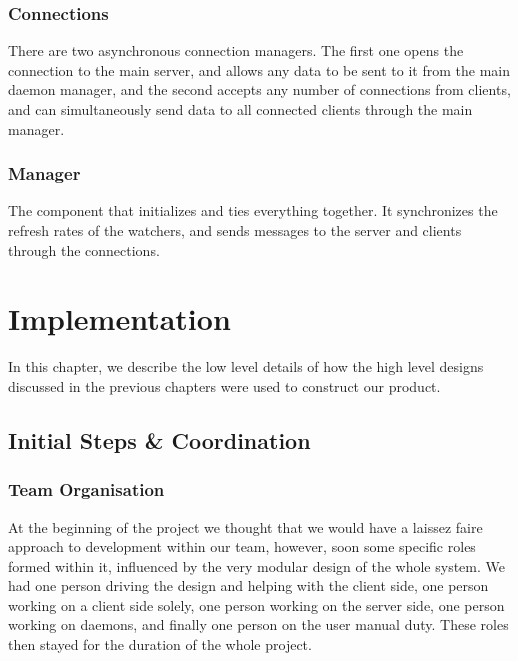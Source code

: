 \documentclass{l3proj}
\begin{document}
\subsection{Connections}
There are two asynchronous connection managers. The first one opens the connection to the main server, and allows any data to be sent to it from the main daemon manager, and the second accepts any number of connections from clients, and can simultaneously send data to all connected clients through the main manager.

\subsection{Manager}
The component that initializes and ties everything together. It synchronizes the refresh rates of the watchers, and sends messages to the server and clients through the connections.



\chapter{Implementation}
\label{impl}

In this chapter, we describe the low level details of how the high level designs discussed in the previous chapters were used to construct our product.


\section{Initial Steps \& Coordination}

\subsection{Team Organisation}

At the beginning of the project we thought that we would have a laissez faire approach to development within our team, however, soon some specific roles formed within it, influenced by the very modular design of the whole system. We had one person driving the design and helping with the client side, one person working on a client side solely, one person working on the server side, one person working on daemons, and finally one person on the user manual duty. These roles then stayed for the duration of the whole project.
\end{document}
